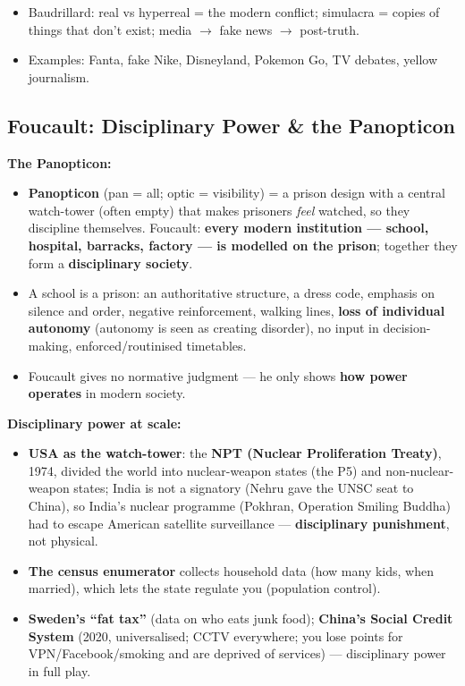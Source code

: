 \begin{QuickRevision}
\begin{itemize}
\item Baudrillard: real vs hyperreal = the modern conflict; simulacra = copies of things that don't exist; media $\rightarrow$ fake news $\rightarrow$ post-truth.
\item Examples: Fanta, fake Nike, Disneyland, Pokemon Go, TV debates, yellow journalism.
\end{itemize}
\end{QuickRevision}

\sectiondivider

\subsection{Foucault: Disciplinary Power \& the Panopticon}

\begin{KeyConcept}
\textbf{The Panopticon:}
\begin{itemize}
\item \textbf{Panopticon} (pan = all; optic = visibility) = a prison design with a central watch-tower (often empty) that makes prisoners \textit{feel} watched, so they discipline themselves. Foucault: \textbf{every modern institution --- school, hospital, barracks, factory --- is modelled on the prison}; together they form a \textbf{disciplinary society}.
\item A school is a prison: an authoritative structure, a dress code, emphasis on silence and order, negative reinforcement, walking lines, \textbf{loss of individual autonomy} (autonomy is seen as creating disorder), no input in decision-making, enforced/routinised timetables.
\item Foucault gives no normative judgment --- he only shows \textbf{how power operates} in modern society.
\end{itemize}
\end{KeyConcept}

\begin{ExampleBox}
\textbf{Disciplinary power at scale:}
\begin{itemize}
\item \textbf{USA as the watch-tower}: the \textbf{NPT (Nuclear Proliferation Treaty)}, 1974, divided the world into nuclear-weapon states (the P5) and non-nuclear-weapon states; India is not a signatory (Nehru gave the UNSC seat to China), so India's nuclear programme (Pokhran, Operation Smiling Buddha) had to escape American satellite surveillance --- \textbf{disciplinary punishment}, not physical.
\item \textbf{The census enumerator} collects household data (how many kids, when married), which lets the state regulate you (population control).
\item \textbf{Sweden's ``fat tax''} (data on who eats junk food); \textbf{China's Social Credit System} (2020, universalised; CCTV everywhere; you lose points for VPN/Facebook/smoking and are deprived of services) --- disciplinary power in full play.
\end{itemize}
\end{ExampleBox}

